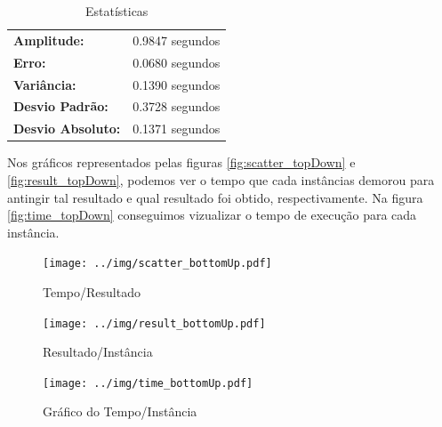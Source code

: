 \documentclass[a4paper, 12pt]{article}
\begin{document}

\begin{table}[!htb]
    \begin{tabular}{ll}
    \textbf{Amplitude:} & 0.9847 segundos \\
    \textbf{Erro:} & 0.0680 segundos \\
    \textbf{Variância:} & 0.1390 segundos \\
    \textbf{Desvio Padrão:} & 0.3728 segundos \\
    \textbf{Desvio Absoluto:} & 0.1371 segundos
    \end{tabular}
    \caption{Estatísticas}
    \label{tab:estatistica_bottomup}
\end{table}

\newpage
Nos gráficos representados pelas figuras \ref{fig:scatter_topDown} e \ref{fig:result_topDown}, podemos ver o tempo
que cada instâncias demorou para antingir tal resultado e qual resultado foi obtido, respectivamente. 
Na figura \ref{fig:time_topDown} conseguimos vizualizar o tempo de execução para cada instância.
\begin{figure}[!htb]
    \centering
    \begin{minipage}{0.55\textwidth}
        \centering
        \texttt{[image: ../img/scatter\_bottomUp.pdf]}
        \caption{Tempo/Resultado}
        \label{fig:scatter_bottomUp}
    \end{minipage}%
    \begin{minipage}{0.55\textwidth}
        \centering
        \texttt{[image: ../img/result\_bottomUp.pdf]}
        \caption{Resultado/Instância}
        \label{fig:result_bottomUp}
    \end{minipage}
\end{figure}

\begin{figure}[!htb]
    \centering
    \texttt{[image: ../img/time\_bottomUp.pdf]}
    \caption{Gráfico do Tempo/Instância}
    \label{fig:time_bottomUp}
\end{figure}

\clearpage
\end{document}
